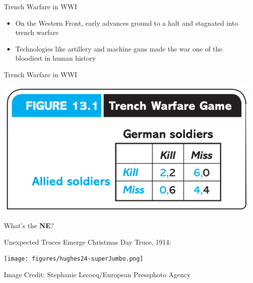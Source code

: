 
\begin{frame}{Trench Warfare in WWI}
  \begin{itemize}
    \item On the Western Front, 
    early advances ground to a halt and stagnated into trench warfare
    \item Technologies like artillery and machine guns made the war one of the bloodiest in human history
  \end{itemize}
\end{frame}

\begin{frame}{Trench Warfare in WWI}
  \begin{center}
  \includegraphics[width=1\textwidth]{figures/fig131.png}
  \end{center}
  What's the \textbf{NE}?
\end{frame}

\begin{frame}{Unexpected Truces Emerge}
  Christmas Day Truce, 1914:
  \begin{center}
    \texttt{[image: figures/hughes24-superJumbo.png]} 
  \end{center}
  {\footnotesize Image Credit: Stephanie Lecocq/European Pressphoto Agency}
\end{frame}

